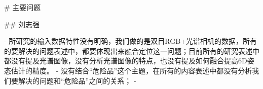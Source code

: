 \documentclass{article}
\begin{document}
\begin{markdown}

# 主要问题

## 刘志强

- 所研究的输入数据特性没有明确，我们做的是双目RGB+光谱相机的数据，所有的要解决的问题表述中，都要体现出来融合定位这一问题；目前所有的研究表述中都没有提及光谱图像，没有分析光谱图像的特点，也没有提及如何融合提高6D姿态估计的精度。
- 没有结合“危险品”这个主题，在所有的内容表述中都没有分析我们要解决的问题和“危险品”之间的关系；
- 






\end{markdown}
\end{document}
